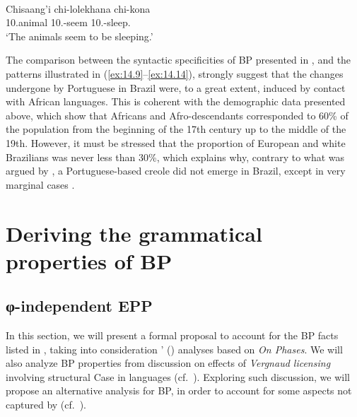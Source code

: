 \documentclass[output=paper]{langsci/langscibook}
\begin{document}
\ea%
    \label{ex:14.14}  \parencite[725]{Carstens2011}\\
    \gll  Chisaang’i chi-lolekhana chi-kona\\
          10.animal 10.\Sm{}-seem 10.\Sm{}-sleep.\Prs\\
    \glt  ‘The animals seem to be sleeping.’
\z

The comparison between the syntactic specificities of \gls{BP} presented in
, and the  patterns illustrated in
(\ref{ex:14.9}--\ref{ex:14.14}), strongly suggest that the changes
undergone by Portuguese in Brazil were, to a great extent, induced by contact
with African languages. This is coherent with the demographic data presented
above, which show that Africans and Afro-descendants corresponded to 60\% of
the population from the beginning of the 17th century up to the middle of the
19th. However, it must be stressed that the proportion of European and white
Brazilians was never less than 30\%, which explains why, contrary to what was
argued by \citet{Guy1981}, a Portuguese-based creole did not emerge in Brazil,
except in very marginal cases \parencite[70]{Lucchesi2009a}.

\section{Deriving the grammatical properties of BP}\label{sec:14.4}

\subsection{φ-independent EPP}\label{sec:14.4.1}

In this section, we will present a formal proposal to account for the \gls{BP}
facts listed in , taking into consideration
\citeauthor{AvelarGalves2011}' (\citeyear{AvelarGalves2011,AvelarGalves2016}) analyses based on  \emph{On Phases}.
We will also analyze \gls{BP} properties from
 discussion on effects of \emph{Vergnaud licensing}
involving structural Case in  languages (cf.\ ).
Exploring such discussion, we will propose an alternative analysis for BP, in
order to account for some aspects not captured by
\textcite{AvelarGalves2011,AvelarGalves2016} (cf.\ ).
\end{document}

